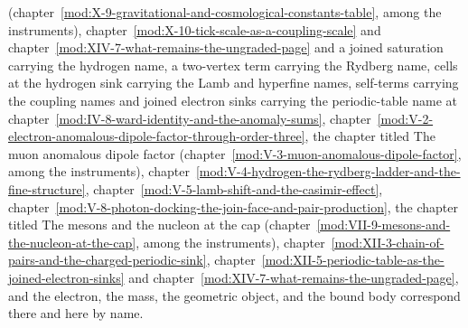 \begin{chbridge}
(chapter~\ref{mod:X-9-gravitational-and-cosmological-constants-table}, among the instruments), chapter~\ref{mod:X-10-tick-scale-as-a-coupling-scale} and chapter~\ref{mod:XIV-7-what-remains-the-ungraded-page} and a joined saturation carrying the hydrogen name, a two-vertex term carrying the Rydberg name, cells at the hydrogen sink carrying the Lamb and hyperfine names, self-terms carrying the coupling names and joined electron sinks carrying the periodic-table name at chapter~\ref{mod:IV-8-ward-identity-and-the-anomaly-sums}, chapter~\ref{mod:V-2-electron-anomalous-dipole-factor-through-order-three}, the chapter titled The muon anomalous dipole factor (chapter~\ref{mod:V-3-muon-anomalous-dipole-factor}, among the instruments), chapter~\ref{mod:V-4-hydrogen-the-rydberg-ladder-and-the-fine-structure}, chapter~\ref{mod:V-5-lamb-shift-and-the-casimir-effect}, chapter~\ref{mod:V-8-photon-docking-the-join-face-and-pair-production}, the chapter titled The mesons and the nucleon at the cap (chapter~\ref{mod:VII-9-mesons-and-the-nucleon-at-the-cap}, among the instruments), chapter~\ref{mod:XII-3-chain-of-pairs-and-the-charged-periodic-sink}, chapter~\ref{mod:XII-5-periodic-table-as-the-joined-electron-sinks} and chapter~\ref{mod:XIV-7-what-remains-the-ungraded-page}, and the electron, the mass, the geometric object, and the bound body correspond there and here by name.
\end{chbridge}
